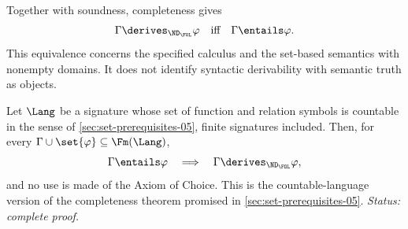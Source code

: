Together with soundness, completeness gives
\[
 \Gamma\derives_{\ND_{\FOL}}\varphi
 \quad\text{iff}\quad
 \Gamma\entails\varphi.
\]
This equivalence concerns the specified calculus and the set-based semantics
with nonempty domains.  It does not identify syntactic derivability
with semantic truth as objects.

\begin{corollary}
\label{cor:fol-completeness-countable}
Let \(\Lang\) be a signature whose set of function and relation symbols
is countable in the sense of \cref{sec:set-prerequisites-05}, finite
signatures included.  Then, for every
\(\Gamma\cup\set{\varphi}\subseteq\Fm(\Lang)\),
\[
 \Gamma\entails\varphi
 \quad\Longrightarrow\quad
 \Gamma\derives_{\ND_{\FOL}}\varphi,
\]
and no use is made of the Axiom of Choice.  This is the
countable-language version of the completeness theorem promised in
\cref{sec:set-prerequisites-05}.
\textit{Status: complete proof.}
\end{corollary}
